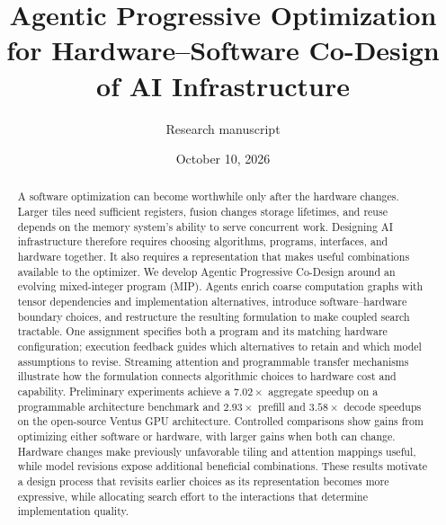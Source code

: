 \documentclass[11pt]{article}
\title{Agentic Progressive Optimization for Hardware--Software Co-Design of AI Infrastructure}
\author{Research manuscript}
\date{October 10, 2026}
\begin{document}
\maketitle
\begin{abstract}
A software optimization can become worthwhile only after the hardware changes. Larger tiles need sufficient registers, fusion changes storage lifetimes, and reuse depends on the memory system's ability to serve concurrent work. Designing AI infrastructure therefore requires choosing algorithms, programs, interfaces, and hardware together. It also requires a representation that makes useful combinations available to the optimizer. We develop Agentic Progressive Co-Design around an evolving mixed-integer program (MIP). Agents enrich coarse computation graphs with tensor dependencies and implementation alternatives, introduce software--hardware boundary choices, and restructure the resulting formulation to make coupled search tractable. One assignment specifies both a program and its matching hardware configuration; execution feedback guides which alternatives to retain and which model assumptions to revise. Streaming attention and programmable transfer mechanisms illustrate how the formulation connects algorithmic choices to hardware cost and capability. Preliminary experiments achieve a $7.02\times$ aggregate speedup on a programmable architecture benchmark and $2.93\times$ prefill and $3.58\times$ decode speedups on the open-source Ventus GPU architecture. Controlled comparisons show gains from optimizing either software or hardware, with larger gains when both can change. Hardware changes make previously unfavorable tiling and attention mappings useful, while model revisions expose additional beneficial combinations. These results motivate a design process that revisits earlier choices as its representation becomes more expressive, while allocating search effort to the interactions that determine implementation quality.
\end{abstract}








\appendix

\end{document}
